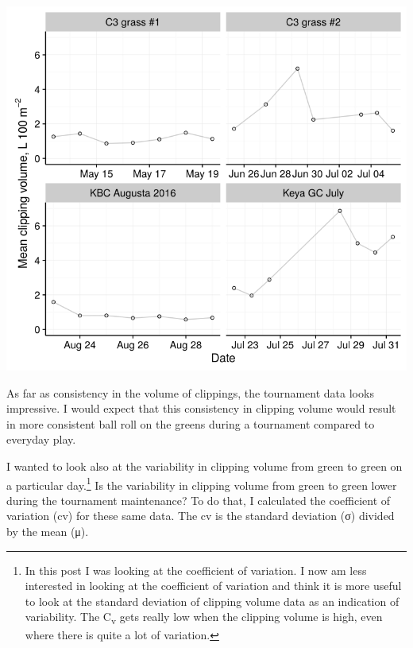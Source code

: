 \documentclass[12pt,b5,]{tufte-book}
\begin{document}
\includegraphics{img/b3-2.png}

As far as consistency in the volume of clippings, the tournament data looks impressive. I would expect that this consistency in clipping volume would result in more consistent ball roll on the greens during a tournament compared to everyday play.

I wanted to look also at the variability in clipping volume from green to green on a particular day.\footnote{In this post I was looking at the coefficient of variation. I now am less interested in looking at the coefficient of variation and think it is more useful to look at the standard deviation of clipping volume data as an indication of variability. The C\textsubscript{v} gets really low when the clipping volume is high, even where there is quite a lot of variation.} Is the variability in clipping volume from green to green lower during the tournament maintenance? To do that, I calculated the coefficient of variation (cv) for these same data. The cv is the standard deviation (σ) divided by the mean (μ).
\end{document}

